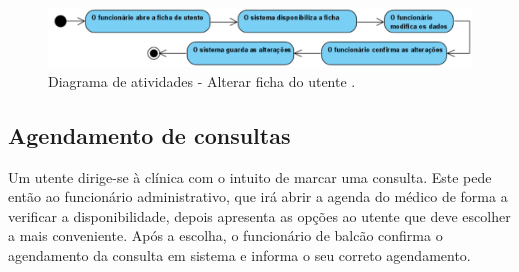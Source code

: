 \documentclass[11pt,a4paper,twoside]{report}
\begin{document}
\begin{figure}[H]
	\centering
	\includegraphics[width=0.7\linewidth]{image/Atividades/AlterarFichaUtente}
	\caption{Diagrama de atividades -   Alterar ficha do utente .}
	\label{fig:alterarfichautente}
\end{figure}


\subsection{Agendamento de consultas }

Um utente dirige-se à clínica com o intuito de marcar uma consulta. Este pede então ao funcionário administrativo, que irá abrir a agenda do médico de forma a verificar a disponibilidade, depois apresenta as opções ao utente que deve escolher a mais conveniente. Após a escolha, o funcionário de balcão confirma o agendamento da consulta em sistema e informa o seu correto agendamento. 
\end{document}
